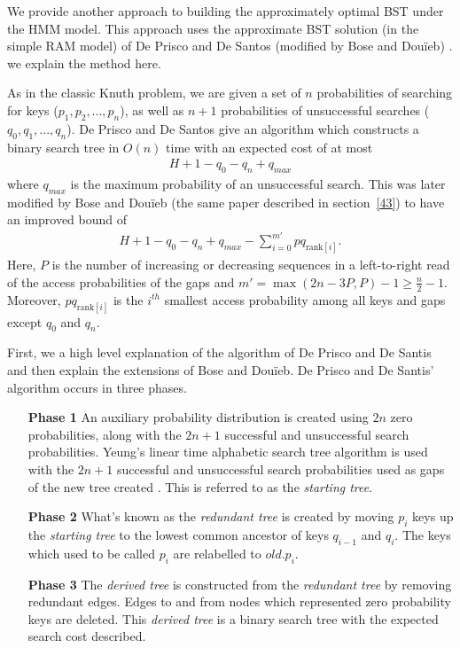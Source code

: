 \documentclass[letterpaper,12pt,titlepage,oneside,final]{book}
\theoremstyle{plain}
\begin{document}
We provide another approach to building the approximately optimal BST under the HMM model. This approach uses the approximate BST solution (in the simple RAM model) of De Prisco and De Santos (modified by Bose and Dou\"{i}eb) \cite{de1993binary, bose2009efficient}. we explain the method here.

As in the classic Knuth problem, we are given a set of $n$ probabilities of searching for keys ($p_1, p_2, ..., p_n$), as well as $n+1$ probabilities of unsuccessful searches ($q_0, q_1, ..., q_n$). De Prisco and De Santos give an algorithm which constructs a binary search tree in $O(n)$ time with an expected cost of at most \cite{de1993binary}
\begin{align*}
H+1-q_0-q_n+q_{max}
\end{align*}
  where $q_{max}$ is the maximum probability of an unsuccessful search. This was later modified by Bose and Dou\"{i}eb (the same paper described in section~\ref{43}) to have an improved bound of \cite{bose2009efficient}
\begin{align*}
H + 1 - q_0 - q_n + q_{max} - \sum_{i=0}^{m'} pq_{\text{rank}[i]}.
\end{align*}
Here, $P$ is the number of increasing or decreasing sequences in a left-to-right read of the access probabilities of the gaps and $m'=\max({2n-3P,P})-1 \geq \frac{n}{2} - 1$.  Moreover, $pq_{\text{rank}[i]}$ is the $i^{th}$ smallest access probability among all keys and gaps except $q_0$ and $q_n$.

First, we a high level explanation of the algorithm of De Prisco and De Santis and then explain the extensions of Bose and Dou\"{i}eb. De Prisco and De Santis' algorithm occurs in three phases.

\begin{itemize}
\item[\textbf{Phase 1}] An auxiliary probability distribution is created using $2n$ zero probabilities, along with the $2n+1$ successful and unsuccessful search probabilities. Yeung's linear time alphabetic search tree algorithm is used with the $2n+1$ successful and unsuccessful search probabilities used as gaps of the new tree created \cite{yeung1991alphabetic}. This is referred to as the \textit{starting tree}.

\item[\textbf{Phase 2}] What's known as the \textit{redundant tree} is created by moving $p_i$ keys up the \textit{starting tree} to the lowest common ancestor of keys $q_{i-1}$ and $q_i$. The keys which used to be called $p_i$ are relabelled to $old.p_i$.

\item[\textbf{Phase 3}] The \textit{derived tree} is constructed from the \textit{redundant tree} by removing redundant edges. Edges to and from nodes which represented zero probability keys are deleted. This \textit{derived tree} is a binary search tree with the expected search cost described.
\end{itemize}
\end{document}
